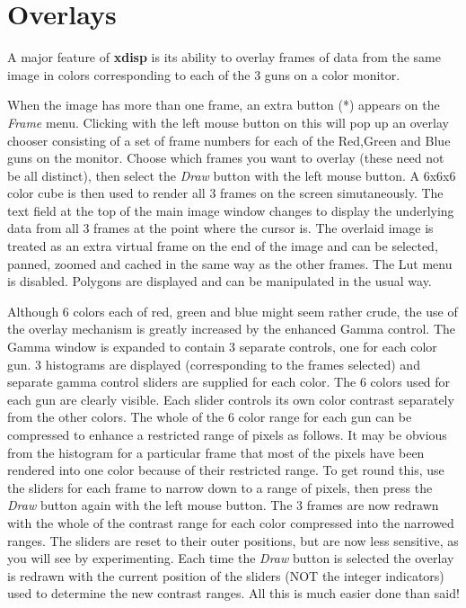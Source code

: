 \section{Overlays}
A major feature of {\bf xdisp} is its ability to overlay frames of data from the same image in colors corresponding to each of the 3 guns on a color monitor.

When the image has more than one frame, an extra button (*) appears on the {\it Frame\/} menu. Clicking with the left mouse button on this will pop up an overlay chooser consisting of a set of frame numbers for each of the Red,Green and Blue guns on the monitor. Choose which frames you want to overlay (these need not be all distinct), then select the {\it Draw\/} button with the left mouse button. A 6x6x6 color cube is then used to render all 3 frames on the screen simutaneously. The text field at the top of the main image window changes to display the underlying data from all 3 frames at the point where the cursor is. The overlaid image is treated as an extra virtual frame on the end of the image and can be selected, panned, zoomed and cached in the same way as the other frames. The Lut menu is disabled. Polygons are displayed and can be manipulated in the usual way.

Although 6 colors each of red, green and blue might seem rather crude, the use of the overlay mechanism is greatly increased by the enhanced Gamma control. The Gamma window is expanded to contain 3 separate controls, one for each color gun. 3 histograms are displayed (corresponding to the frames selected) and separate gamma control sliders are supplied for each color. The 6 colors used for each gun are clearly visible. Each slider controls its own color contrast separately from the other colors. The whole of the 6 color range for each gun can be compressed to enhance a restricted range of pixels as follows. It may be obvious from the histogram for a particular frame that most of the pixels have been rendered into one color because of their restricted range. To get round this, use the sliders for each frame to narrow down to a range of pixels, then press the {\it Draw\/} button again with the left mouse button. The 3 frames are now redrawn with the whole of the contrast range for each color compressed into the narrowed ranges. The sliders are reset to their outer positions, but are now  less sensitive, as you will see by experimenting. Each time the {\it Draw\/} button is selected the overlay is redrawn with the current position of the sliders (NOT the integer indicators) used to determine the new contrast ranges. All this is much easier done than said!

